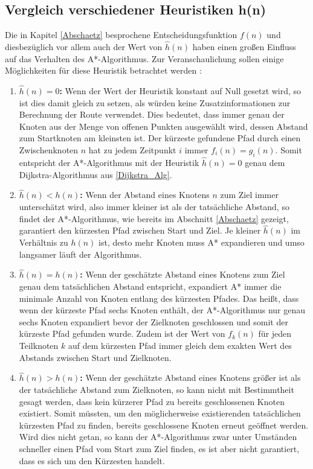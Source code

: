 	\subsection{Vergleich verschiedener Heuristiken h(n)}
		\label{Heuristik}
		Die in Kapitel \ref{Abschaetz} besprochene Entscheidungsfunktion $f(n)$ und diesbezüglich vor allem auch der Wert von $\hat{h}(n)$ haben einen großen Einfluss auf das Verhalten des A*-Algorithmus.
		Zur Veranschaulichung sollen einige Möglichkeiten für diese Heuristik betrachtet werden \cite{Patel2016}:
		\begin{enumerate}
			\item \textbf{$\hat{h}(n)=0$:} Wenn der Wert der Heuristik konstant auf Null gesetzt wird, so ist dies damit gleich zu setzen, als würden keine Zusatzinformationen zur Berechnung der Route verwendet. Dies bedeutet, dass immer genau der Knoten aus der Menge von offenen Punkten ausgewählt wird, dessen Abstand zum Startknoten am kleinsten ist. Der kürzeste gefundene Pfad durch einen Zwischenknoten $n$ hat zu jedem Zeitpunkt $i$ immer $f_i(n)=g_i(n)$. Somit entspricht der A*-Algorithmus mit der Heuristik $\hat{h}(n)=0$ genau dem Dijkstra-Algorithmus aus \ref{Dijkstra_Alg}.
			
			\item \textbf{$\hat{h}(n)<h(n)$:} Wenn der Abstand eines Knotens $n$ zum Ziel immer unterschätzt wird, also immer kleiner ist als der tatsächliche Abstand, so findet der A*-Algorithmus, wie bereits im Abschnitt \ref{Abschaetz} gezeigt, garantiert den kürzesten Pfad zwischen Start und Ziel. Je kleiner $\hat{h}(n)$ im Verhältnis zu $h(n)$ ist, desto mehr Knoten muss A* expandieren und umso langsamer läuft der Algorithmus.
			
			\item \textbf{$\hat{h}(n)=h(n)$:} Wenn der geschätzte Abstand eines Knotens zum Ziel genau dem tatsächlichen Abstand entspricht, expandiert A* immer die minimale Anzahl von Knoten entlang des kürzesten Pfades. Das heißt, dass wenn der kürzeste Pfad sechs Knoten enthält, der A*-Algorithmus nur genau sechs Knoten expandiert bevor der Zielknoten geschlossen und somit der kürzeste Pfad gefunden wurde. Zudem ist der Wert von $f_k(n)$ für jeden Teilknoten $k$ auf dem kürzesten Pfad immer gleich dem exakten Wert des Abstands zwischen Start und Zielknoten.
			
			\item \textbf{$\hat{h}(n)>h(n)$:} Wenn der geschätzte Abstand eines Knotens größer ist als der tatsächliche Abstand zum Zielknoten, so kann nicht mit Bestimmtheit gesagt werden, dass kein kürzerer Pfad zu bereits geschlossenen Knoten existiert.  Somit müssten, um den möglicherweise existierenden tatsächlichen kürzesten Pfad zu finden, bereits geschlossene Knoten erneut geöffnet werden. Wird dies nicht getan, so kann der A*-Algorithmus zwar unter Umständen schneller einen Pfad vom Start zum Ziel finden, es ist aber nicht garantiert, dass es sich um den Kürzesten handelt.
			

\end{enumerate}

